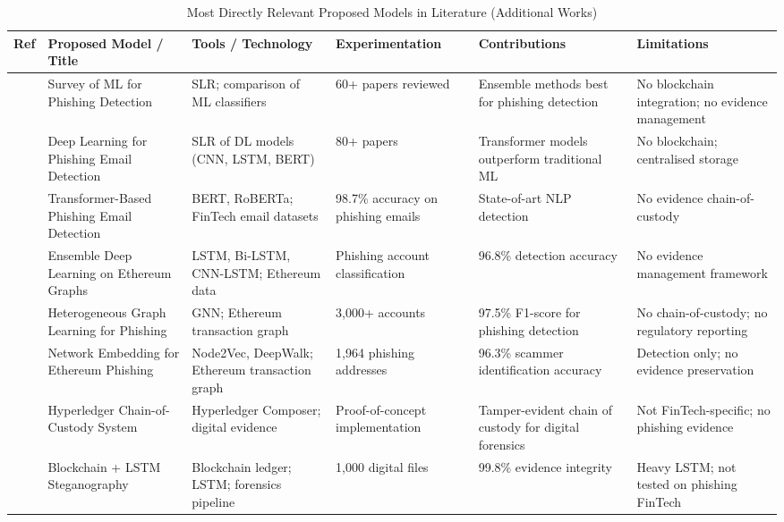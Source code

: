 \documentclass[conference]{IEEEtran}
\begin{document}
\begin{table}[!t]
\caption{Most Directly Relevant Proposed Models in Literature (Additional Works)}
\label{tab:litreview}
\centering
\renewcommand{\arraystretch}{1.2}
\begin{tabular}{|p{0.4cm}|p{2.8cm}|p{2.6cm}|p{2.8cm}|p{3.0cm}|p{3.0cm}|}
\hline
\textbf{Ref} & \textbf{Proposed Model / Title} & \textbf{Tools / Technology} & \textbf{Experimentation} & \textbf{Contributions} & \textbf{Limitations} \\
\hline
\cite{tang2021} &
Survey of ML for Phishing Detection &
SLR; comparison of ML classifiers &
60+ papers reviewed &
Ensemble methods best for phishing detection &
No blockchain integration; no evidence management \\
\hline
\cite{thakur2023} &
Deep Learning for Phishing Email Detection &
SLR of DL models (CNN, LSTM, BERT) &
80+ papers &
Transformer models outperform traditional ML &
No blockchain; centralised storage \\
\hline
\cite{melendez2024} &
Transformer-Based Phishing Email Detection &
BERT, RoBERTa; FinTech email datasets &
98.7\% accuracy on phishing emails &
State-of-art NLP detection &
No evidence chain-of-custody \\
\hline
\cite{malla2023} &
Ensemble Deep Learning on Ethereum Graphs &
LSTM, Bi-LSTM, CNN-LSTM; Ethereum data &
Phishing account classification &
96.8\% detection accuracy &
No evidence management framework \\
\hline
\cite{kim2023} &
Heterogeneous Graph Learning for Phishing &
GNN; Ethereum transaction graph &
3,000+ accounts &
97.5\% F1-score for phishing detection &
No chain-of-custody; no regulatory reporting \\
\hline
\cite{wu2020} &
Network Embedding for Ethereum Phishing &
Node2Vec, DeepWalk; Ethereum transaction graph &
1,964 phishing addresses &
96.3\% scammer identification accuracy &
Detection only; no evidence preservation \\
\hline
\cite{lone2019} &
Hyperledger Chain-of-Custody System &
Hyperledger Composer; digital evidence &
Proof-of-concept implementation &
Tamper-evident chain of custody for digital forensics &
Not FinTech-specific; no phishing evidence \\
\hline
\cite{faour2024} &
Blockchain + LSTM Steganography &
Blockchain ledger; LSTM; forensics pipeline &
1,000 digital files &
99.8\% evidence integrity &
Heavy LSTM; not tested on phishing FinTech \\
\hline
\end{tabular}
\end{table}
\end{document}
